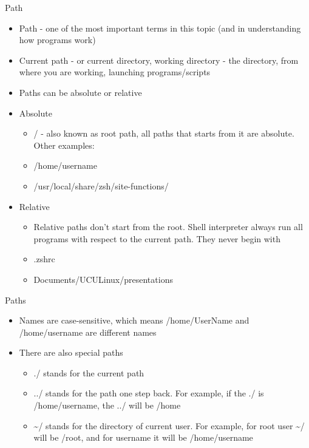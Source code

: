 \documentclass[usenames,dvipsnames,10pt,aspectratio=169]{beamer}
\begin{document}
\begin{frame}{Path}
    \begin{itemize}
        \item  {\color{ucugreen} Path} - one of the most important terms in this topic (and in understanding how programs work)
        \item Current path - or current directory, working directory - the directory, from where you are working, launching programs/scripts
        \item Paths can be absolute or relative
        \item Absolute
            \begin{itemize}
                \item {\color{ucugreen} /} - also known as  {\color{ucugreen} root path}, all paths that starts from it are {\color{ucugreen} absolute}. Other examples:
                \item {\color{ucugreen} /home/username}
                \item {\color{ucugreen} /usr/local/share/zsh/site-functions/}
            \end{itemize}
        \item Relative
            \begin{itemize}
                \item Relative paths don't start from the root. Shell interpreter always run all programs with respect to the current path. They never begin with \ex{/}
                \item {\color{ucugreen} .zshrc}
                \item {\color{ucugreen} Documents/UCULinux/presentations}
            \end{itemize}
    \end{itemize}
\end{frame}

\begin{frame}{Paths}
    \begin{itemize}
        \item Names are case-sensitive, which means {\color{ucugreen} /home/UserName} and {\color{ucugreen} /home/username} are different names
        \item There are also special paths
        \begin{itemize}
            \item {\color{ucugreen} ./} stands for the current path
            \item {\color{ucugreen} ../} stands for the path one step back. For example, if the {\color{ucugreen} ./} is {\color{ucugreen} /home/username}, the {\color{ucugreen} ../} will be {\color{ucugreen} /home}
            \item {\color{ucugreen} \textasciitilde /} stands for the directory of current user. For example, for {\color{ucugreen} root} user {\color{ucugreen} \textasciitilde/} will be {\color{ucugreen} /root}, and for {\color{ucugreen} username} it will be {\color{ucugreen} /home/username}
        \end{itemize}
    \end{itemize}
\end{frame}
\end{document}
